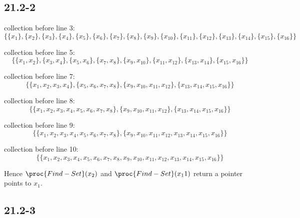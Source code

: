 \subsection*{21.2-2}

collection before line 3: 
\begin{equation*}
    \{ \{ x_{1} \}, \{ x_{2} \}, \{ x_{3} \}, \{ x_{4} \}, \{ x_{5} \}, 
    \{ x_{6} \}, \{ x_{7} \}, \{ x_{8} \}, \{ x_{9} \}, \{ x_{10} \}, 
    \{ x_{11} \}, \{ x_{12} \}, \{ x_{13} \}, \{ x_{14} \}, \{ x_{15} \}, 
    \{ x_{16} \} \}
\end{equation*}

collection before line 5: 
\begin{equation*}
    \{ \{ x_{1}, x_{2} \}, \{ x_{3}, x_{4} \}, \{ x_{5}, x_{6} \}, 
    \{ x_{7}, x_{8} \}, \{ x_{9}, x_{10} \}, 
    \{ x_{11}, x_{12} \}, \{ x_{13}, x_{14} \}, \{ x_{15}, x_{16} \} \}
\end{equation*}

collection before line 7: 
\begin{equation*}
    \{ \{ x_{1}, x_{2}, x_{3}, x_{4} \}, \{ x_{5}, x_{6}, x_{7}, x_{8} \}, 
    \{ x_{9}, x_{10}, x_{11}, x_{12} \}, \{ x_{13}, x_{14}, x_{15}, x_{16} \} \}
\end{equation*}

collection before line 8: 
\begin{equation*}
    \{ \{ x_{1}, x_{2}, x_{3}, x_{4}, x_{5}, x_{6}, x_{7}, x_{8} \}, 
    \{ x_{9}, x_{10}, x_{11}, x_{12} \}, \{ x_{13}, x_{14}, x_{15}, x_{16} \} \}
\end{equation*}

collection before line 9: 
\begin{equation*}
    \{ \{ x_{1}, x_{2}, x_{3}, x_{4}, x_{5}, x_{6}, x_{7}, x_{8} \}, 
    \{ x_{9}, x_{10}, x_{11}, x_{12}, x_{13}, x_{14}, x_{15}, x_{16} \} \}
\end{equation*}

collection before line 10: 
\begin{equation*}
    \{ \{ x_{1}, x_{2}, x_{3}, x_{4}, x_{5}, x_{6}, x_{7}, x_{8},
    x_{9}, x_{10}, x_{11}, x_{12}, x_{13}, x_{14}, x_{15}, x_{16} \} \}
\end{equation*}

Hence $\proc{Find-Set}(x_2)$ and $\proc{Find-Set}(x_11)$
return a pointer points to $x_1$.

\subsection*{21.2-3}

